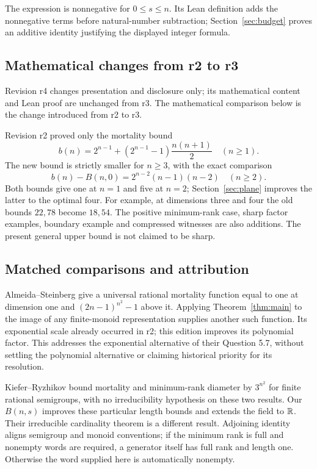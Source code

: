 The expression is nonnegative for \(0\leq s\leq n\). Its Lean definition adds the nonnegative terms before natural-number subtraction; Section~\ref{sec:budget} proves an additive identity justifying the displayed integer formula.

\subsection{Mathematical changes from r2 to r3}
Revision r4 changes presentation and disclosure only; its mathematical content and Lean proof are unchanged from r3. The mathematical comparison below is the change introduced from r2 to r3.

Revision r2 \cite{PreviousEdition} proved only the mortality bound
\[
 b(n)=2^{n-1}+(2^{n-1}-1)\frac{n(n+1)}2\quad(n\geq1).
\]
The new bound is strictly smaller for \(n\geq3\), with the exact comparison
\begin{equation}\label{eq:comparison}
 b(n)-B(n,0)=2^{n-2}(n-1)(n-2)\quad(n\geq2).
\end{equation}
Both bounds give one at \(n=1\) and five at \(n=2\); Section~\ref{sec:plane} improves the latter to the optimal four. For example, at dimensions three and four the old bounds \(22,78\) become \(18,54\). The positive minimum-rank case, sharp factor examples, boundary example and compressed witnesses are also additions. The present general upper bound is not claimed to be sharp.

\subsection{Matched comparisons and attribution}
Almeida--Steinberg \cite[Definitions 2.1 and 5.1, Theorem 5.6]{AS2009} give a universal rational mortality function equal to one at dimension one and \((2n-1)^{n^2}-1\) above it. Applying Theorem~\ref{thm:main} to the image of any finite-monoid representation supplies another such function. Its exponential scale already occurred in r2; this edition improves its polynomial factor. This addresses the exponential alternative of their Question 5.7, without settling the polynomial alternative or claiming historical priority for its resolution.

Kiefer--Ryzhikov \cite[Theorem 7.1 and Proposition 7.3]{KR2026} bound mortality and minimum-rank diameter by \(3^{n^2}\) for finite rational semigroups, with no irreducibility hypothesis on these two results. Our \(B(n,s)\) improves these particular length bounds and extends the field to \(\mathbb R\). Their irreducible cardinality theorem is a different result. Adjoining identity aligns semigroup and monoid conventions; if the minimum rank is full and nonempty words are required, a generator itself has full rank and length one. Otherwise the word supplied here is automatically nonempty.

